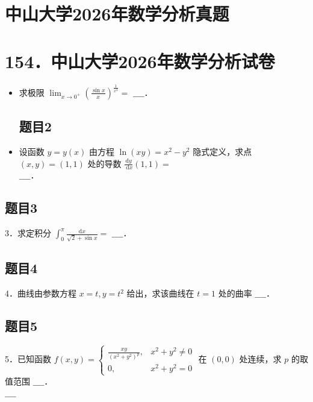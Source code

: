 \documentclass{article}
\begin{document}
\section*{中山大学2026年数学分析真题}
\section*{154．中山大学2026年数学分析试卷}
\begin{itemize}

\subsection{题目1}
  \item[1．] 求极限 \(\lim _{x \rightarrow 0^{+}}\left(\frac{\sin x}{x}\right)^{\frac{1}{x^{2}}}=\) \(\_\_\_\_\)．

\subsection{题目2}
  \item[2．] 设函数 \(y=y(x)\) 由方程 \(\ln (x y)=x^{2}-y^{2}\) 隐式定义，求点 \((x, y)=(1,1)\) 处的导数 \(\frac{\mathrm{d} y}{\mathrm{~d} x}(1,1)=\)\\
\(\_\_\_\_\)．
\end{itemize}

\subsection{题目3}
3．求定积分 \(\int_{0}^{\pi} \frac{\mathrm{d} x}{\sqrt{2}+\sin x}=\) \(\_\_\_\_\)．

\subsection{题目4}
4．曲线由参数方程 \(x=t, y=t^{2}\) 给出，求该曲线在 \(t=1\) 处的曲率 \(\_\_\_\_\)．

\subsection{题目5}
5．已知函数 \(f(x, y)=\left\{\begin{array}{ll}\frac{x y}{\left(x^{2}+y^{2}\right)^{p}}, & x^{2}+y^{2} \neq 0 \\ 0, & x^{2}+y^{2}=0\end{array}\right.\) 在 \((0,0)\) 处连续，求 \(p\) 的取值范围 \(\_\_\_\_\)．\\
\(\_\_\_\_\)
\end{document}
